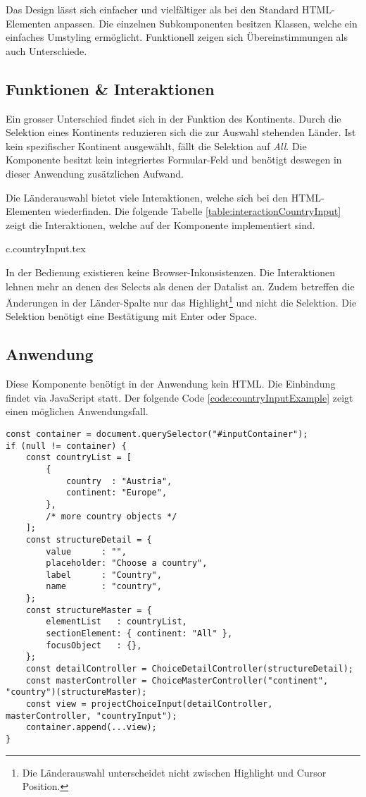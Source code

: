Das Design lässt sich einfacher und vielfältiger als bei den Standard HTML-Elementen anpassen.
Die einzelnen Subkomponenten besitzen Klassen, welche ein einfaches Umstyling ermöglicht.
Funktionell zeigen sich Übereinstimmungen als auch Unterschiede.


\subsection{Funktionen \& Interaktionen}
\label{sec:countryChoiceFunction}

Ein grosser Unterschied findet sich in der Funktion des Kontinents.
Durch die Selektion eines Kontinents reduzieren sich die zur Auswahl stehenden Länder.
Ist kein spezifischer Kontinent ausgewählt, fällt die Selektion auf \emph{All}.
Die Komponente besitzt kein integriertes Formular-Feld und benötigt deswegen in dieser Anwendung zusätzlichen Aufwand.

Die Länderauswahl bietet viele Interaktionen, welche sich bei den HTML-Elementen wiederfinden.
Die folgende Tabelle \ref{table:interactionCountryInput} zeigt die Interaktionen, welche auf der Komponente implementiert sind.

{c.countryInput.tex}

In der Bedienung existieren keine Browser-Inkonsistenzen.
Die Interaktionen lehnen mehr an denen des Selects als denen der Datalist an.
Zudem betreffen die Änderungen in der Länder-Spalte nur das Highlight\footnote{
    Die Länderauswahl unterscheidet nicht zwischen Highlight und Cursor Position.
} und nicht die Selektion.
Die Selektion benötigt eine Bestätigung mit Enter oder Space.

\subsection{Anwendung}
\label{sec:countryChoiceUse}

Diese Komponente benötigt in der Anwendung kein HTML.
Die Einbindung findet via JavaScript statt.
Der folgende Code \ref{code:countryInputExample} zeigt einen möglichen Anwendungsfall.

\begin{lstlisting}[style = htmlcssjs, caption = Länderauswahl Beispiel, label = code:countryInputExample]
const container = document.querySelector("#inputContainer");
if (null != container) {
    const countryList = [
        {
            country  : "Austria",
            continent: "Europe",
        },
        /* more country objects */
    ];
    const structureDetail = {
        value      : "",
        placeholder: "Choose a country",
        label      : "Country",
        name       : "country",
    };
    const structureMaster = {
        elementList   : countryList,
        sectionElement: { continent: "All" },
        focusObject   : {},
    };
    const detailController = ChoiceDetailController(structureDetail);
    const masterController = ChoiceMasterController("continent", "country")(structureMaster);
    const view = projectChoiceInput(detailController, masterController, "countryInput");
    container.append(...view);
}
\end{lstlisting}

